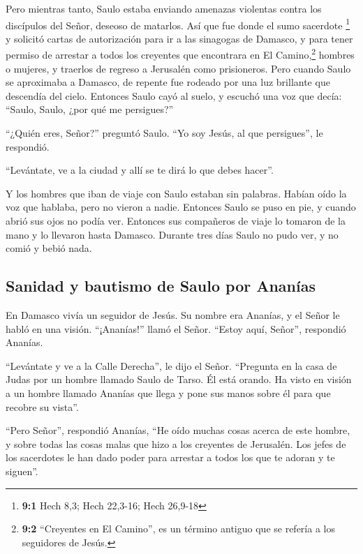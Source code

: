 Pero mientras tanto, Saulo estaba enviando amenazas
violentas contra los discípulos del Señor, deseoso de matarlos. Así que
fue donde el sumo sacerdote \footnote{\textbf{9:1} Hech 8,3; Hech
  22,3-16; Hech 26,9-18}  y solicitó cartas de
autorización para ir a las sinagogas de Damasco, y para tener permiso de
arrestar a todos los creyentes que encontrara en El Camino,\footnote{\textbf{9:2}
  ``Creyentes en El Camino'', es un término antiguo que se refería a los
  seguidores de Jesús.} hombres o mujeres, y traerlos de regreso a
Jerusalén como prisioneros.  Pero cuando Saulo se
aproximaba a Damasco, de repente fue rodeado por una luz brillante que
descendía del cielo.  Entonces Saulo cayó al suelo, y
escuchó una voz que decía: ``Saulo, Saulo, ¿por qué me persigues?''

 ``¿Quién eres, Señor?'' preguntó Saulo. ``Yo soy Jesús,
al que persigues'', le respondió.

 ``Levántate, ve a la ciudad y allí se te dirá lo que
debes hacer''.

 Y los hombres que iban de viaje con Saulo estaban sin
palabras. Habían oído la voz que hablaba, pero no vieron a nadie.
 Entonces Saulo se puso en pie, y cuando abrió sus ojos no
podía ver. Entonces sus compañeros de viaje lo tomaron de la mano y lo
llevaron hasta Damasco.  Durante tres días Saulo no pudo
ver, y no comió y bebió nada.

\hypertarget{sanidad-y-bautismo-de-saulo-por-ananuxedas}{%
\subsection{Sanidad y bautismo de Saulo por
Ananías}\label{sanidad-y-bautismo-de-saulo-por-ananuxedas}}

 En Damasco vivía un seguidor de Jesús. Su nombre era
Ananías, y el Señor le habló en una visión. ``¡Ananías!'' llamó el
Señor. ``Estoy aquí, Señor'', respondió Ananías.

 ``Levántate y ve a la Calle Derecha'', le dijo el Señor.
``Pregunta en la casa de Judas por un hombre llamado Saulo de Tarso. Él
está orando.  Ha visto en visión a un hombre llamado
Ananías que llega y pone sus manos sobre él para que recobre su vista''.

 ``Pero Señor'', respondió Ananías, ``He oído muchas
cosas acerca de este hombre, y sobre todas las cosas malas que hizo a
los creyentes de Jerusalén.  Los jefes de los sacerdotes
le han dado poder para arrestar a todos los que te adoran y te siguen''.

